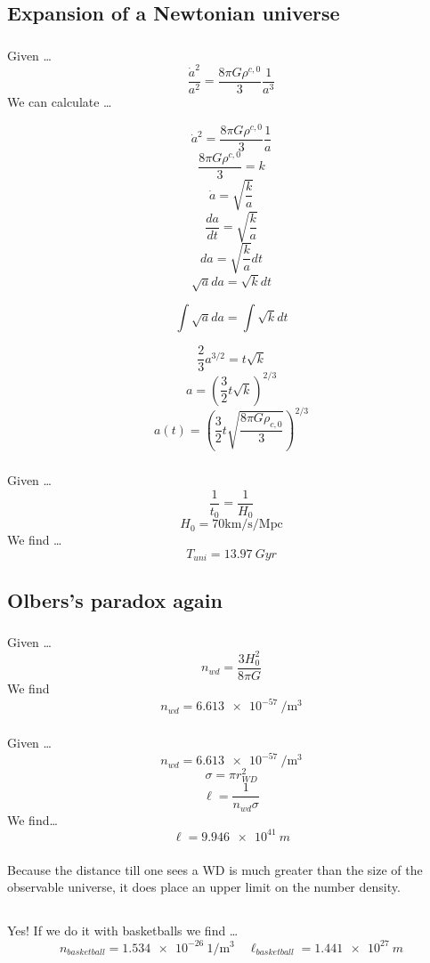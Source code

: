 \documentclass{article}
\begin{document}
\subsection{Expansion of a Newtonian universe}
\subsubsection{}
Given \dots 
\[\frac{\dot{a}^2}{a^2} = \frac{8\pi G \rho^{c,0}}{3} \frac{1}{a^3}\]
We can calculate \dots 

\[{\dot{a}^2} = \frac{8\pi G \rho^{c,0}}{3}\frac{1}{a}\]
\[\frac{8\pi G \rho^{c,0}}{3} = k\]
\[\dot{a} = \sqrt{\frac{k}{a}} \]
\[\frac{da}{dt} = \sqrt{\frac{k}{a}}\]
\[da = \sqrt{\frac{k}{a}} dt\]
\[\sqrt{a} da = \sqrt{{k}} dt\]

\[\int\sqrt{a} da = \int\sqrt{{k}} dt\]

\[\frac{2}{3} a^{3/2} = t\sqrt{{k}} \]
\[a = \left(\frac{3}{2} t\sqrt{k}\right)^{2/3}\]
\[\boxed{a(t) = \left(\frac{3}{2} t\sqrt{\frac{8\pi G \rho_{c,0}}{3}}\right)^{2/3}}\]


\subsubsection{}

\subsubsection{}
Given \dots 
\[\frac{1}{t_0} = \frac{1}{H_0}\]
\[H_0 = 70\text{km/s/Mpc}\]
We find \dots 
\[\boxed{T_{uni}= \SI{13.97}{Gyr}}\]

\subsection{Olbers's paradox again}
\subsubsection{}
Given \dots 
\[n_{wd} = \frac{3H_0^2}{8\pi G }\]
We find 
\[\boxed{n_{wd} = \SI{6.613e-57}{/ \m^3}}\]


\subsubsection{}
Given \dots 
\[n_{wd} = \SI{6.613e-57}{/ \m^3}\]
\[\sigma=\pi r_{WD}^2\]
\[\ell = \frac{1}{n_{wd} \sigma}\]
We find\dots
\[\ell = \SI{ 9.946e+41}{m}\]

\subsubsection{}
Because the distance till one sees a WD is much greater than the size of the observable universe, it does place an upper limit on the number density.

\subsection{}
Yes! If we do it with basketballs we find \dots
\[n_{basketball} = \SI{1.534e-26}{1/\m^3} \quad \ell_{basketball} = \SI{1.441e+27}{m}\]


\printbibliography[
heading=bibintoc,
title={\centering Sources}
]
\end{document}
